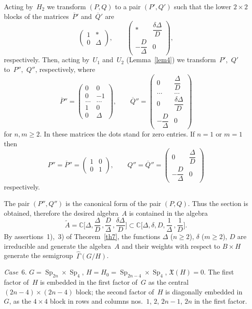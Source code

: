\documentclass[12pt]{amsart}
\theoremstyle{definition}
\theoremstyle{remark}
\begin{document}
Acting by~$H_2$ we transform $(P,Q)$ to a pair $(P',Q')$ such that
the lower $2\times 2$ blocks of the matrices~$\overline P{}'$
and~$\overline Q{}'$ are
$$
\begin{pmatrix}
1 & *
\\
0 & \Delta
\end{pmatrix},\qquad
\begin{pmatrix}
* & \dfrac{\delta\Delta}D
\\
-\dfrac D\Delta & 0
\end{pmatrix},
$$
respectively. Then, acting by~$U_1$ and~$U_2$ (Lemma~\ref{lem4}) we
transform~$P'$,~$Q'$ to~$P''$,~$Q''$, respectively, where
$$
\overline P{}''=
\begin{pmatrix}
0 & 0
\\
0 & -1
\\
\hdots & \hdots
\\
1 & 0
\\
0 & \Delta
\end{pmatrix},\qquad
\overline Q{}''=
\begin{pmatrix}
0 & \dfrac\Delta{D}
\\
\hdots & \hdots
\\
0 & \dfrac{\delta\Delta}D
\\
-\dfrac D\Delta & 0
\end{pmatrix}
$$
for $n,m{\geqslant}2$. In these matrices the dots stand for zero entries. If
$n=1$ or $m=1$ then
$$
P''=\overline P{}''=\begin{pmatrix} 1 & 0
\\
0 & 1
\end{pmatrix},\qquad
Q''=\overline Q{}''=\begin{pmatrix} 0 & \dfrac\Delta D
\\
-\dfrac D\Delta & 0
\end{pmatrix}
$$
respectively.

The pair $(P'',Q'')$ is the canonical form of the pair $(P,Q)$. Thus
the section is obtained, therefore the desired algebra~$A$ is
contained in the algebra
$$
\tilde
A=\mathbb{C}\biggl[\Delta,\frac{\Delta}{D}\,,\frac{D}{\Delta}\,,
\frac{\delta\Delta}{D}\biggr]\subset
\mathbb{C}\biggl[\Delta,\delta,D,\frac{1}{\Delta}\,,\frac{1}{D}\biggr].
$$
By assertions~1),~3) of Theorem~\ref{th7}, the functions $\Delta$
($n {\geqslant}2$), $\delta$ ($m {\geqslant}2$), $D$ are irreducible and generate
the algebra~$A$ and their weights with respect to $B\times H$
generate the semigroup~$\widehat\Gamma(G/H)$.

\textsl{Case}~6. $G={\operatorname{Sp}}_{2n}\times {\operatorname{Sp}}_4$,
$H=H_0={\operatorname{Sp}}_{2n-4}\times {\operatorname{Sp}}_4$, $\mathfrak{X}(H)=0$. The first
factor of~$H$ is embedded in the first factor of~$G$ as the central
$(2n-4)\times(2n-4)$ block; the second factor of~$H$ is diagonally
embedded in~$G$, as the $4\times 4$ block in rows and columns
nos.~$1$, $2$, $2n-1$, $2n$ in the first factor.
\end{document}

